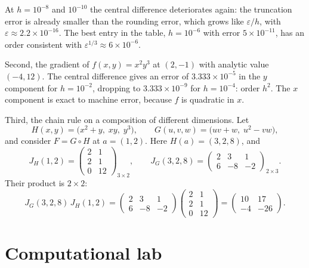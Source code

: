 At $h=10^{-8}$ and $10^{-10}$ the central difference deteriorates again: the truncation error
is already smaller than the rounding error, which grows like $\varepsilon/h$, with
$\varepsilon\approx2.2\times10^{-16}$. The best entry in the table, $h=10^{-6}$ with error
$5\times10^{-11}$, has an order consistent with $\varepsilon^{1/3}\approx6\times10^{-6}$.

Second, the gradient of $f(x,y)=x^{2}y^{3}$ at $(2,-1)$ with analytic value $(-4,12)$. The
central difference gives an error of $3.333\times10^{-5}$ in the $y$ component for
$h=10^{-2}$, dropping to $3.333\times10^{-9}$ for $h=10^{-4}$: order $h^{2}$. The $x$
component is exact to machine error, because $f$ is quadratic in $x$.

Third, the chain rule on a composition of different dimensions. Let
\[
  H(x,y)=\bigl(x^{2}+y,\;xy,\;y^{3}\bigr),\qquad
  G(u,v,w)=\bigl(uv+w,\;u^{2}-vw\bigr),
\]
and consider $F=G\circ H$ at $a=(1,2)$. Here $H(a)=(3,2,8)$, and
\[
  J_{H}(1,2)=\begin{pmatrix}2&1\\ 2&1\\ 0&12\end{pmatrix}_{3\times2},
  \qquad
  J_{G}(3,2,8)=\begin{pmatrix}2&3&1\\ 6&-8&-2\end{pmatrix}_{2\times3}.
\]
Their product is $2\times2$:
\[
  J_{G}(3,2,8)\,J_{H}(1,2)=
  \begin{pmatrix}2&3&1\\ 6&-8&-2\end{pmatrix}
  \begin{pmatrix}2&1\\ 2&1\\ 0&12\end{pmatrix}
  =\begin{pmatrix}10&17\\ -4&-26\end{pmatrix}.
\]

\section{Computational lab}

